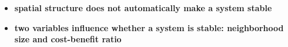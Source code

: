 \begin{itemize}
	\item{\textbf{spatial structure does not automatically make a system stable}}\\
	\item{\textbf{two variables influence whether a system is stable: neighborhood size and cost-benefit ratio}}
\end{itemize}


\begin{comment}
In conclusion, we found that people who oppose hosting more refugees tend to overestimate the real numbers whereas people who favor hosting more refugees tend to underestimate the real numbers. However, our data do not support a correlation between precision of estimate and attitude. We cannot tell from our data if this means that subtle perception rather than knowledge influences people's attitude towards refugees. We therefore recommend further investigating this question with a more differentiated questionnaire that incorporates a well-defined proxy for the interviewees knowledge on refugees.\\
While gender and age did not significantly influence attitude in our study, answers differed significantly among places where the interviews were conducted. When reproducing this study, places for the interviews should be selected so that they represent an average of the population. Furthermore, we recommend using printed questionnaires to ensure objective and honest answers.


It is widely assumed that spatial structure allows for the evolution of cooperation in PD games. However, this goes only for a small range of cost-benefit ratios. Cooperation is only evolutionarily stable for r-values $ \leq 0.09$, for bigger r-values it disappears from the population.\\

In spatial HD games: small neighborhoods = bigger profit when r is small, and small neighborhoods = bigger disadvantage when r is big.

In spatial PD games: 

Found anomality

r 0.03, nb4 -> stable at propC 0.35 after 2500 steps -> stable
r 0.065, nb4 -> cooperators die after 900 steps -> unstable
r 0.03, nb8 -> stable at propC 0.77 after 10000 steps -> stable
r 0.065, nb8 -> stable at propC 0.55 after 2500 steps -> stable
r 0.03, nb12 -> stable at propC 0.825 after 7500 steps -> stable
r 0.065, nb12 -> randomly oscillating around propC 0.33 after 10000 steps -> half-stable
r 0.03, nb24 -> stable at propC 0.85 after 4000 steps -> stable
r 0.065, nb 24 -> cooperators die after 7400 steps -> unstable


fixed r: at 0.03 and 0.065
varying neighborhood size
5000 steps, 5 repetitions

\end{comment}

